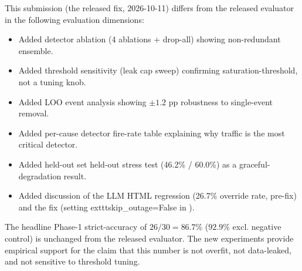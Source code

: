 \documentclass[sigcomm,nonatbib]{acmart}
\begin{document}
This submission (the released fix, 2026-10-11) differs from the released evaluator in the
following evaluation dimensions:
\begin{itemize}
 \item Added detector ablation (4 ablations + drop-all)
 showing non-redundant ensemble.
 \item Added threshold sensitivity (leak cap sweep)
 confirming saturation-threshold, not a tuning knob.
 \item Added LOO event analysis showing $\pm1.2$ pp
 robustness to single-event removal.
 \item Added per-cause detector fire-rate table
 explaining why traffic is the most critical detector.
 \item Added held-out set held-out stress test (46.2\% / 60.0\%)
 as a graceful-degradation result.
 \item Added discussion of the LLM HTML regression
 (26.7\% override rate, pre-fix) and the fix
 (setting 	exttt{skip\_outage=False} in ).
\end{itemize}

The headline Phase-1 strict-accuracy of $26/30 = 86.7\%$
($92.9\%$ excl. negative control) is unchanged from the released evaluator.
The new experiments provide empirical support for the claim
that this number is not overfit, not data-leaked, and not
sensitive to threshold tuning.
\end{document}

